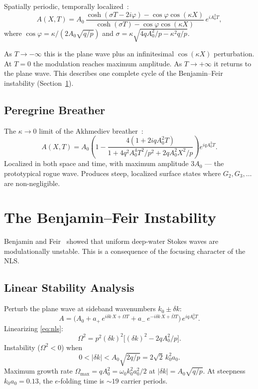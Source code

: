 \documentclass[11pt]{article}
\begin{document}
Spatially periodic, temporally localized~\cite{akhmediev1987}:
\begin{equation}
A(X,T) = A_0\,\frac{\cosh(\sigma T - 2i\varphi)
- \cos\varphi\cos(\kappa X)}
{\cosh(\sigma T) - \cos\varphi\cos(\kappa X)}\,e^{iA_0^2 T},
\label{eq:akhmediev}
\end{equation}
where $\cos\varphi = \kappa/(2A_0\sqrt{q/p})$ and
$\sigma = \kappa\sqrt{4qA_0^2/p - \kappa^2 q/p}$.

As $T \to -\infty$ this is the plane wave plus an infinitesimal
$\cos(\kappa X)$ perturbation.
At $T = 0$ the modulation reaches maximum amplitude.
As $T \to +\infty$ it returns to the plane wave.
This describes one complete cycle of the Benjamin--Feir instability
(Section~\ref{sec:bf}).

\subsection{Peregrine Breather}

The $\kappa \to 0$ limit of the Akhmediev breather~\cite{peregrine1983}:
\begin{equation}
A(X,T) = A_0\left(1 - \frac{4(1 + 2iqA_0^2 T)}
{1 + 4q^2 A_0^4 T^2/p^2 + 2qA_0^2 X^2/p}\right)e^{iqA_0^2 T}.
\label{eq:peregrine}
\end{equation}
Localized in both space and time, with maximum amplitude $3A_0$ ---
the prototypical rogue wave.
Produces steep, localized surface states where $G_2, G_3, \ldots$
are non-negligible.


\section{The Benjamin--Feir Instability}
\label{sec:bf}

Benjamin and Feir~\cite{benjamin1967} showed that uniform deep-water
Stokes waves are modulationally unstable.
This is a consequence of the focusing character of the NLS.

\subsection{Linear Stability Analysis}

Perturb the plane wave at sideband wavenumbers $k_0 \pm \delta k$:
\[
A = \bigl(A_0 + a_+\,e^{i\delta k\,X + \Omega T}
+ a_-\,e^{-i\delta k\,X + \bar\Omega T}\bigr)\,e^{iqA_0^2 T}.
\]
Linearizing \eqref{eq:nls}:
\begin{equation}
\Omega^2 = p^2(\delta k)^2\bigl[(\delta k)^2 - 2qA_0^2/p\bigr].
\label{eq:bf_growth}
\end{equation}
Instability ($\Omega^2 < 0$) when
\begin{equation}
0 < |\delta k| < A_0\sqrt{2q/p} = 2\sqrt{2}\,k_0^2 a_0.
\label{eq:bf_criterion}
\end{equation}
Maximum growth rate $\Omega_{\max} = qA_0^2 = \omega_0 k_0^2 a_0^2/2$
at $|\delta k| = A_0\sqrt{q/p}$.
At steepness $k_0 a_0 = 0.13$, the $e$-folding time is $\sim 19$ carrier periods.
\end{document}
